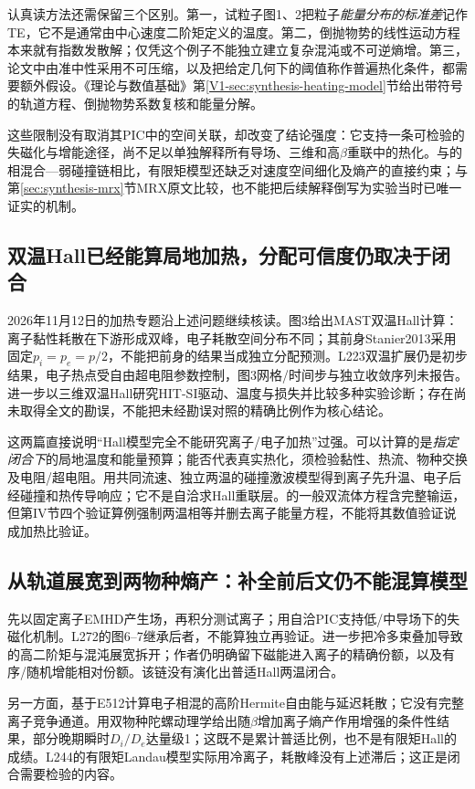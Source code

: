 \documentclass[UTF8,a4paper,11pt,openany,fontset=fandol]{ctexbook}
\begin{document}
认真读方法还需保留三个区别。第一，试粒子图1、2把粒子\emph{能量分布的标准差}记作TE，它不是通常由中心速度二阶矩定义的温度。第二，倒抛物势的线性运动方程本来就有指数发散解；仅凭这个例子不能独立建立复杂混沌或不可逆熵增。第三，论文中由准中性采用不可压缩，以及把给定几何下的阈值称作普遍热化条件，都需要额外假设。《理论与数值基础》第\ref{V1-sec:synthesis-heating-model}节给出带符号的轨道方程、倒抛物势系数复核和能量分解。

这些限制没有取消其PIC中的空间关联，却改变了结论强度：它支持一条可检验的失磁化与增能途径，尚不足以单独解释所有导场、三维和高$\beta$重联中的热化。与\citet{E512}的相混合—弱碰撞链相比，有限矩模型还缺乏对速度空间细化及熵产的直接约束；与第\ref{sec:synthesis-mrx}节MRX原文比较，也不能把后续解释倒写为实验当时已唯一证实的机制。

\subsection{双温Hall已经能算局地加热，分配可信度仍取决于闭合}
2026年11月12日的加热专题沿上述问题继续核读。\citet{L223}图3给出MAST双温Hall计算：离子黏性耗散在下游形成双峰，电子耗散空间分布不同；其前身Stanier2013采用固定$p_i=p_e=p/2$，不能把前身的结果当成独立分配预测。L223双温扩展仍是初步结果，电子热点受自由超电阻参数控制，图3网格/时间步与独立收敛序列未报告。\citet{Kaptanoglu2020}进一步以三维双温Hall研究HIT-SI驱动、温度与损失并比较多种实验诊断；存在尚未取得全文的勘误，不能把未经勘误对照的精确比例作为核心结论。

这两篇直接说明“Hall模型完全不能研究离子/电子加热”过强。可以计算的是\emph{指定闭合下}的局地温度和能量预算；能否代表真实热化，须检验黏性、热流、物种交换及电阻/超电阻。\citet{L164}用共同流速、独立两温的碰撞激波模型得到离子先升温、电子后经碰撞和热传导响应；它不是自洽求Hall重联层。\citet{L247}的一般双流体方程含完整输运，但第IV节四个验证算例强制两温相等并删去离子能量方程，不能将其数值验证说成加热比验证。

\subsection{从轨道展宽到两物种熵产：补全前后文仍不能混算模型}
\citet{Yoon2018Heating}先以固定离子EMHD产生场，再积分测试离子；\citet{F743}用自洽PIC支持低/中导场下的失磁化机制。L272的图6--7继承后者，不能算独立再验证。\citet{Yoon2023PhaseSpace}进一步把冷多束叠加导致的高二阶矩与混沌展宽拆开；作者仍明确留下磁能进入离子的精确份额，以及有序/随机增能相对份额。该链没有演化出普适Hall两温闭合。

另一方面，\citet{Loureiro2013Heating}基于E512计算电子相混的高阶Hermite自由能与延迟耗散；它没有完整离子竞争通道。\citet{Numata2015Heating}用双物种陀螺动理学给出随$\beta$增加离子熵产作用增强的条件性结果，部分晚期瞬时$D_i/D_e$达量级1；这既不是累计普适比例，也不是有限矩Hall的成绩。L244的有限矩Landau模型实际用冷离子，耗散峰没有上述滞后；这正是闭合需要检验的内容。\citep{L244}
\end{document}
